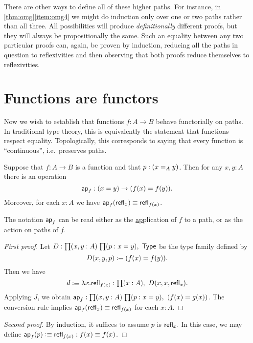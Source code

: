 \begin{rmk}
  There are other ways to define all of these higher paths.
  For instance, in \autoref{thm:omg}\ref{item:omg4} we might do induction only over one or two paths rather than all three.
  All possibilities will produce \emph{definitionally} different proofs, but they will always be propositionally the same.
  Such an equality between any two particular proofs can, again, be proven by induction, reducing all the paths in question to reflexivities and then observing that both proofs reduce themselves to reflexivities.
\end{rmk}

\section{Functions are functors}
\label{sec:functors}

Now we wish to establish that functions $f:A\to B$ behave functorially on paths.
In traditional type theory, this is equivalently the statement that functions respect equality.
Topologically, this corresponds to saying that every function is ``continuous'', i.e.\ preserves paths.

\begin{lem}\label{lem:map}
  Suppose that $f:A\to B$ is a function and that $p:(\id[A]xy)$.
  Then for any $x,y:A$ there is an operation
  \begin{equation*}
    \apfunc f : (x=y) \to (f(x)= f(y)).
  \end{equation*}
  Moreover, for each $x:A$ we have $\apfunc{f}(\refl{x})\jdeq \refl{f(x)}$.
\end{lem}

The notation $\apfunc f$ can be read either as the \underline{ap}plication of $f$ to a path, or as the \underline{a}ction on \underline{p}aths of $f$.

\begin{proof}[First proof]
  Let $D:\prd{x,y:A}{p:x=y}\type$ be the type family defined by
  \[D(x,y,p)\defeq (f(x)= f(y)).\]
  Then we have
  \begin{equation*}
    d\defeq\lambda x.\refl{f(x)}:\prd{x:A} D(x,x,\refl{x}).
  \end{equation*}
  Applying $J$, we obtain $\apfunc f : \prd{x,y:A}{p:x=y}(f(x)=g(x))$.
  The conversion rule implies $\apfunc f({\refl{x}})\jdeq\refl{f(x)}$ for each $x:A$.
\end{proof}

\begin{proof}[Second proof]
  By induction, it suffices to assume $p$ is $\refl{x}$.
  In this case, we may define $\apfunc f(p) \defeq \refl{f(x)}:f(x)\jdeq f(x)$.
\end{proof}


